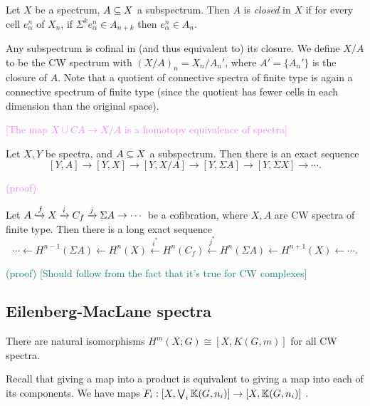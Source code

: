 \documentclass{MetricNotes2023}
\def\bb{\ensuremath\mathbb}
\def\subq{\ensuremath\subseteq}
\def\xinj{\ensuremath\xhookrightarrow}
\def\textcolour{\textcolor}
\begin{document}
\begin{definition}
Let \(X\) be a spectrum, \(A\subq X\) a subspectrum. Then \(A\) is \textit{closed} in \(X\) if for every cell \(e_\alpha^n\) of \(X_n\), if \(\Sigma^k e_\alpha^n \in A_{n+k}\) then \(e_\alpha^n \in A_n\). 
\end{definition}

Any subspectrum is cofinal in (and thus equivalent to) its closure. We define \(X/A\) to be the CW spectrum with \((X/A)_n=X_n/A_n'\), where \(A'=\{A_n'\}\) is the closure of \(A\). Note that a quotient of connective spectra of finite type is again a connective spectrum of finite type (since the quotient has fewer cells in each dimension than the original space).

\textcolour{violet}{[The map \(X\cup CA\to X/A\) is a homotopy equivalence of spectra]}

\begin{theorem}
Let \(X,Y\) be spectra, and \(A\subq X\) a subspectrum. Then there is an exact sequence
\[[Y,A]\to[Y,X]\to[Y,X/A]\to[Y,\Sigma A]\to[Y,\Sigma X]\to\cdots.\]
\end{theorem}

\textcolour{violet}{(proof)}

\begin{lemma}\label{2504140954}
Let \(A \xinj f X \xrightarrow{i} C_f \xrightarrow{j} \Sigma A \to \cdots\) be a cofibration, where \(X, A\) are CW spectra of finite type. Then there is a long exact sequence 
\[\cdots \leftarrow H^{n-1}(\Sigma A) \leftarrow H^n(X) \xleftarrow{i^*} H^n(C_f) \xleftarrow{j^*} H^n(\Sigma A)\leftarrow H^{n+1}(X) \leftarrow \cdots.\]
\end{lemma}

\textcolour{teal}{(proof) [Should follow from the fact that it's true for CW complexes]}

\subsection{Eilenberg-MacLane spectra}

\begin{theorem}\label{2503221328}
There are natural isomorphisms \(H^m(X;G)\cong [X,K(G,m)]\) for all CW spectra.
\end{theorem}

Recall that giving a map into a product is equivalent to giving a map into each of its components. We have maps \(F_i : [X, \bigvee_i \bb{K}(G,n_i)]\to [X,\bb{K}(G,n_i)]\) .
\end{document}
